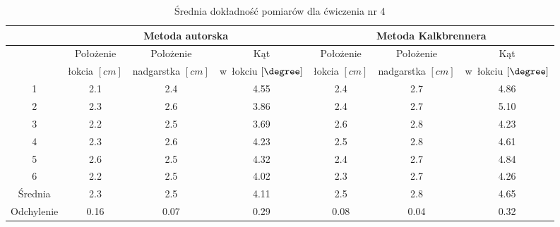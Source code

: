 \begin{table}[!htb]
	\caption{Średnia dokładność pomiarów dla ćwiczenia nr 4}
	\label{tab:experiments:four:avg}
	\noindent
	\tiny
	\centering
	\begin{tabular}{|c|c|c|c|c|c|c|}
		\hline 
		& \multicolumn{3}{c|}{Metoda autorska} & \multicolumn{3}{c|}{Metoda Kalkbrennera}  \\ 
		\hline 
		           & Położenie    & Położenie       & Kąt                  & Położenie    & Położenie       & Kąt                  \\
		           & łokcia $[cm]$ & nadgarstka $[cm]$ & w~łokciu	$[\degree]$ & łokcia $[cm]$ & nadgarstka $[cm]$ & w~łokciu	$[\degree]$ \\
		\hline
		1          & 2.1            & 2.4               & 4.55                  & 2.4            & 2.7               & 4.86                  \\
		2          & 2.3            & 2.6               & 3.86                  & 2.4            & 2.7               & 5.10                  \\
		3          & 2.2            & 2.5               & 3.69                  & 2.6            & 2.8               & 4.23                  \\
		4          & 2.3            & 2.6               & 4.23                  & 2.5            & 2.8               & 4.61                  \\
		5          & 2.6            & 2.5               & 4.32                  & 2.4            & 2.7               & 4.84                  \\
		6          & 2.2            & 2.5               & 4.02                  & 2.3            & 2.7               & 4.26                  \\
		\hline
														
		Średnia   & 2.3            & 2.5               & 4.11                  & 2.5            & 2.8               & 4.65                  \\
		Odchylenie & 0.16           & 0.07              & 0.29                  & 0.08           & 0.04              & 0.32                  \\
		\hline
	\end{tabular} 
						
\end{table} 


